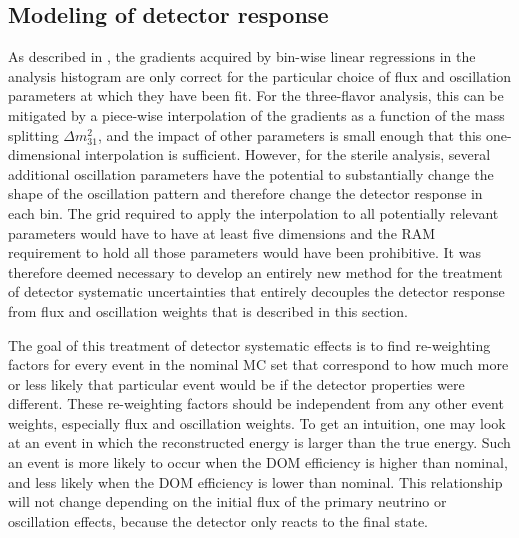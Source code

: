 \subsection{Modeling of detector response}
\label{sec:ultrasurfaces}

 As described in , the gradients acquired by bin-wise linear regressions in the analysis histogram are only correct for the particular choice of flux and oscillation parameters at which they have been fit. For the three-flavor analysis, this can be mitigated by a piece-wise interpolation of the gradients as a function of the mass splitting $\Delta m^2_{31}$, and the impact of other parameters is small enough that this one-dimensional interpolation is sufficient. However, for the sterile analysis, several additional oscillation parameters have the potential to substantially change the shape of the oscillation pattern and therefore change the detector response in each bin. The grid required to apply the interpolation to all potentially relevant parameters would have to have at least five dimensions and the RAM requirement to hold all those parameters would have been prohibitive. It was therefore deemed necessary to develop an entirely new method for the treatment of detector systematic uncertainties that entirely decouples the detector response from flux and oscillation weights that is described in this section.

The goal of this treatment of detector systematic effects is to find re-weighting factors for every event in the nominal MC set that correspond to how much more or less likely that particular event would be if the detector properties were different. These re-weighting factors should be independent from any other event weights, especially flux and oscillation weights. To get an intuition, one may look at an event in which the reconstructed energy is larger than the true energy. Such an event is more likely to occur when the DOM efficiency is higher than nominal, and less likely when the DOM efficiency is lower than nominal. This relationship will not change depending on the initial flux of the primary neutrino or oscillation effects, because the detector only reacts to the final state.

